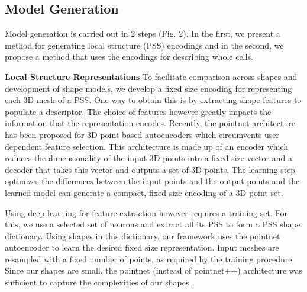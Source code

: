 \documentclass[runningheads]{llncs}
\begin{document}


\subsection{\textbf{Model Generation }}
Model generation is carried out in 2 steps (Fig. 2). In the first, we present a method for generating local structure (PSS) encodings  and in the second, we propose a method that uses the encodings for describing whole cells.

\noindent \textbf{Local Structure Representations} 
To facilitate comparison across shapes and development of shape models, we develop a fixed size encoding for representing each 3D mesh of a PSS.  One way to obtain this is by extracting shape features to populate a descriptor. The choice of features however greatly impacts the information that the representation encodes. Recently, the pointnet architecture \cite{qi2017pointnet}  has been proposed for 3D point based autoencoders which circumvents user dependent feature selection. This architecture is made up of an encoder which reduces the dimensionality of the input 3D points into a fixed size vector and a decoder that takes this vector and outputs a set of 3D points. The learning step optimizes the differences between the input points and the output points and the learned model can generate a compact, fixed size encoding of a 3D point set.

Using deep learning for feature extraction however requires a training set. For this, we use a selected set of neurons and extract all its PSS to form a PSS shape dictionary.
Using shapes in this dictionary, our framework uses the pointnet autoencoder \cite{qi2017pointnet} to learn the desired fixed size representation. 
Input meshes are resampled with a fixed number of points, as required by the training procedure. Since our shapes are small, the pointnet (instead of pointnet++) architecture was sufficient to capture the complexities of our shapes.
\end{document}

